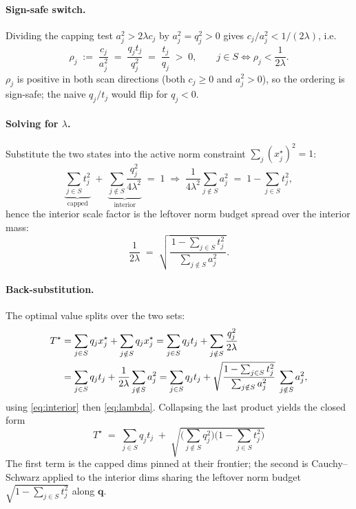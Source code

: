 \documentclass[11pt,a4paper]{article}
\newcommand{\qv}{\mathbf{q}}
\begin{document}
\paragraph{Sign-safe switch.} Dividing the capping test $a_j^2>2\lambda c_j$ by
$a_j^2=q_j^2>0$ gives $c_j/a_j^2 < 1/(2\lambda)$, i.e.
\begin{equation}
  \rho_j \;:=\; \frac{c_j}{a_j^2} \;=\; \frac{q_j t_j}{q_j^2} \;=\; \frac{t_j}{q_j}
  \;>\;0,\qquad
  j\in S \iff \rho_j < \frac{1}{2\lambda}.
\end{equation}
$\rho_j$ is positive in both scan directions (both $c_j\ge0$ and $a_j^2>0$), so
the ordering is sign-safe; the naive $q_j/t_j$ would flip for $q_j<0$.

\paragraph{Solving for $\lambda$.} Substitute the two states into the active norm
constraint $\sum_j (x_j^\star)^2 = 1$:
\begin{equation}
  \underbrace{\sum_{j\in S} t_j^2}_{\text{capped}}
  \;+\; \underbrace{\sum_{j\notin S}\frac{q_j^2}{4\lambda^2}}_{\text{interior}}
  \;=\; 1
  \;\Longrightarrow\;
  \frac{1}{4\lambda^2}\sum_{j\notin S} a_j^2 \;=\; 1-\sum_{j\in S} t_j^2,
\end{equation}
hence the interior scale factor is the leftover norm budget spread over the
interior mass:
\begin{equation}
  \frac{1}{2\lambda}
  \;=\; \sqrt{\frac{\,1-\sum_{j\in S} t_j^2\,}{\sum_{j\notin S} a_j^2}} .
  \label{eq:lambda}
\end{equation}

\paragraph{Back-substitution.} The optimal value splits over the two sets:
\begin{align}
  T^\star
   &= \sum_{j\in S} q_j x_j^\star + \sum_{j\notin S} q_j x_j^\star
    = \sum_{j\in S} q_j t_j + \sum_{j\notin S} \frac{q_j^2}{2\lambda}
      \notag\\
   &= \sum_{j\in S} q_j t_j
    + \frac{1}{2\lambda}\sum_{j\notin S} a_j^2
    = \sum_{j\in S} q_j t_j
    + \sqrt{\frac{1-\sum_{j\in S}t_j^2}{\sum_{j\notin S}a_j^2}}\;\sum_{j\notin S} a_j^2,
\end{align}
using \eqref{eq:interior} then \eqref{eq:lambda}. Collapsing the last product
yields the closed form
\begin{equation}
  \boxed{\;
  T^\star \;=\; \sum_{j\in S} q_j t_j
  \;+\; \sqrt{\Big(\sum_{j\notin S} q_j^2\Big)\Big(1-\sum_{j\in S} t_j^2\Big)}
  \;}
  \label{eq:waterfill}
\end{equation}
The first term is the capped dims pinned at their frontier; the second is
Cauchy--Schwarz applied to the interior dims sharing the leftover norm budget
$\sqrt{1-\sum_{j\in S}t_j^2}$ along $\qv$.
\end{document}
